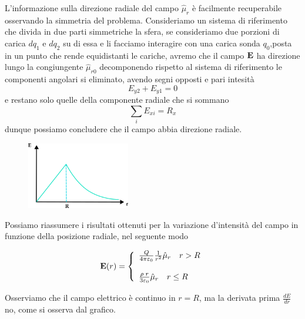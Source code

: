 L'informazione sulla direzione radiale del campo $\hat{\mu}_{r}$ \`e facilmente recuperabile osservando la simmetria del problema. Consideriamo un sistema di riferimento che divida in due parti simmetriche la sfera, se consideriamo due porzioni di carica $dq_1$ e $dq_2$ su di essa  e li facciamo interagire con una carica sonda $q_0$,posta in un punto che rende equidistanti le cariche, avremo che il campo $\bold{E}$ ha direzione lungo la congiungente $\hat{\mu}_{r0}$ decomponendo rispetto al sistema di riferimento le componenti angolari si eliminato, avendo segni opposti e pari intesit\`a
\begin{equation*}
	E_{y2} + E_{y1} =0
\end{equation*}
e restano solo quelle della componente radiale che si sommano
\begin{equation*}
	\sum_{i}E_{xi} = R_{x}
\end{equation*}
dunque possiamo concludere che il campo abbia direzione radiale.

\begin{figure}  %
    \centering
    \includegraphics[width=0.4\textwidth]{images/gsphera}  %
\end{figure}
\vspace{0.5cm}
\noindent Possiamo riassumere i risultati ottenuti per la variazione d'intensit\`a del campo in funzione della posizione radiale, nel seguente modo

\begin{equation}
	\bold{E}(r) = \left \{ \begin{array}{l}
	\frac{Q}{4 \pi \varepsilon_0}\frac{1}{r^2} \hat{\mu}_{r} \quad r >R \\[0.5cm]
	\frac{\rho \; r}{3 \varepsilon_0} \hat{\mu}_{r} \quad r \leq R
	\end{array}\right.
\end{equation}
\newline

\noindent Osserviamo che il campo elettrico \`e continuo in $r=R$, ma la derivata prima $\frac{dE}{dr}$ no, come si osserva dal grafico.

